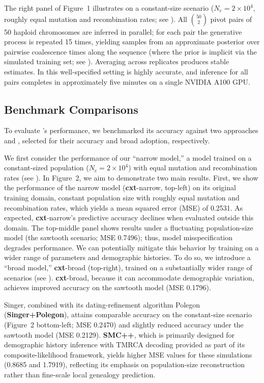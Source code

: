 \documentclass[9pt,twocolumn,twoside]{pnas-new}
\begin{document}
The right panel of Figure~1 illustrates \cxtkit on a constant-size scenario
($N_e = 2 \times 10^{4}$, roughly equal mutation and recombination rates; see ).
All $\binom{50}{2}$ pivot pairs of 50 haploid chromosomes are inferred in parallel;
for each pair the generative process is repeated 15 times, yielding samples from an approximate
posterior over pairwise coalescence times along the sequence
(where the prior is implicit via the simulated training set; see ).
Averaging across replicates produces stable estimates.
In this well-specified setting \cxtkit is highly accurate,
and inference for all pairs completes in approximately five minutes on a single NVIDIA A100 GPU.


\subsection*{Benchmark Comparisons}

To evaluate \cxtkit's performance, we benchmarked its accuracy against two approaches 
\singer and \smcpp \cite{deng_robust_2024, terhorst_robust_2017}, selected for their 
accuracy and broad adoption, respectively.

We first consider the performance of our ``narrow model,'' a \cxtkit{}
model trained on a constant-sized population (\(N_e = 2 \times 10^{4}\))
with equal mutation and recombination rates (see ).
In Figure~2, we aim to demonstrate two main results.
First, we show the performance of the narrow model (\textbf{cxt}-narrow, top-left)
on its original training domain, constant population size with roughly equal
mutation and recombination rates, which yields a mean squared error (MSE) of 0.2531.
As expected, \textbf{cxt}-narrow's predictive accuracy declines when evaluated
outside this domain. The top-middle panel shows results under a fluctuating
population-size model (the sawtooth scenario; MSE 0.7496); thus, model
misspecification degrades performance.
We can potentially mitigate this behavior by training \cxtkit{} on a wider range
of parameters and demographic histories. To do so, we introduce a ``broad model,''
\textbf{cxt}-broad (top-right), trained on a substantially wider range of scenarios
(see ). 
\textbf{cxt}-broad, because it can accommodate demographic variation,
achieves improved accuracy on the sawtooth model (MSE 0.1796). 


Singer, combined with its dating-refinement algorithm Polegon (\textbf{Singer+Polegon}), 
attains comparable accuracy on the constant-size scenario (Figure~2 bottom-left; MSE 0.2470)
and slightly reduced accuracy under the sawtooth model (MSE 0.2129). 
\textbf{SMC++}, which is primarily designed for demographic history inference with 
TMRCA decoding provided as part of its composite-likelihood framework, 
yields higher MSE values for these simulations (0.8685 and 1.7919), 
reflecting its emphasis on population-size reconstruction rather than fine-scale local genealogy prediction.
\end{document}
